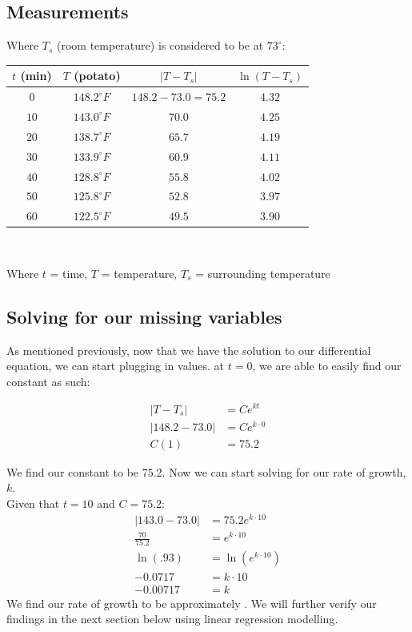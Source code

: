 \documentclass{article}
\begin{document}
\subsection{Measurements}
Where $T_s$  (room temperature) is considered to be at $73^{\circ}$:
\begin{center}
    \begin{tabular}{|c|c|c|c|}
    \hline
    $t$ (min) & $T$ (potato) & $|T-T_s|$ & $\ln(T-T_s)$  \\\hline
    $0$ & $148.2^{\circ} F$ & $148.2 - 73.0 = 75.2$ & $4.32$ \\\hline  
    $10$ & $143.0^{\circ} F$ & $70.0$ & $4.25$ \\\hline
    $20$ & $138.7^{\circ} F$ & $65.7$ & $4.19$ \\\hline
    $30$ & $133.9^{\circ} F$ & $60.9$ & $4.11$ \\\hline
    $40$ & $128.8^{\circ} F$ & $55.8$ & $4.02$ \\\hline
    $50$ & $125.8^{\circ} F$ & $52.8$ & $3.97$ \\\hline
    $60$ & $122.5^{\circ} F$ & $49.5$ & $3.90$\\\hline
    \end{tabular}\\[1em]
\end{center}
\begin{center}
    Where $t$ = time, $T$ = temperature, $T_s$ = surrounding temperature
\end{center}
\newpage

\subsection{Solving for our missing variables}
As mentioned previously, now that we have the solution to our differential equation, we can start plugging in values. at $t = 0$, we are able to easily find our constant as such:

\begin{align}
    |T-T_s| &= Ce^{kt}\\[1em]
    |148.2-73.0| &= Ce^{k\cdot 0}\\[1em]
    C(1) &= 75.2
\end{align}

We find our constant to be 75.2. Now we can start solving for our rate of growth, $k$.\\

Given that $t = 10$ and $C = 75.2$:
\begin{align}
    |143.0-73.0| &= 75.2e^{k\cdot 10}\\[1em]
    \frac{70}{75.2} &= e^{k\cdot 10}\\[1em]
    \ln{(.93)} &= \ln{(e^{k\cdot 10})}\\[1em]
    -0.0717 &= k \cdot 10 \\[1em]
    -0.00717 &= k
\end{align}
We find our rate of growth to be approximately  . We will further verify our findings in the next section below using linear regression modelling.
\end{document}
